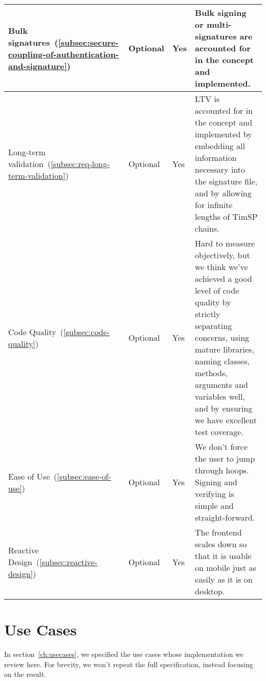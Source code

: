 \begin{center}
\begin{longtable}{p{4.0cm}|p{1.35cm}|p{0.7cm}|p{9.0cm}}
        \\
        \hline
        Bulk signatures~(\ref{subsec:secure-coupling-of-authentication-and-signature})
        & Optional
        & Yes
        & Bulk signing or multi-signatures are accounted for in the concept and implemented.
        \\
        \hline
        Long-term validation~(\ref{subsec:req-long-term-validation})
        & Optional
        & Yes
        & \gls{LTV} is accounted for in the concept and implemented by embedding all information
        necessary into the signature file, and by allowing for infinite lengths of \gls{TimSP} chains.
        \\
        \hline
        Code Quality~(\ref{subsec:code-quality})
        & Optional
        & Yes
        & Hard to measure objectively,
        but we think we've achieved a good level of code quality by strictly separating concerns,
        using mature libraries,
        naming classes, methods, arguments and variables well,
        and by ensuring we have excellent test coverage.
        \\
        \hline
        Ease of Use~(\ref{subsec:ease-of-use})
        & Optional
        & Yes
        & We don't force the user to jump through hoops.
        Signing and verifying is simple and straight-forward.
        \\
        \hline
        Reactive Design~(\ref{subsec:reactive-design})
        & Optional
        & Yes
        & The frontend scales down so that it is usable on mobile just as easily as it is on desktop.
        \\
        \hline
    \end{longtable}
\end{center}

\section{Use Cases}\label{subsec:use-cases}
In section~\ref{ch:usecases},
we specified the use cases whose implementation we review here.
For brevity, we won't repeat the full specification,
instead focusing on the result.

